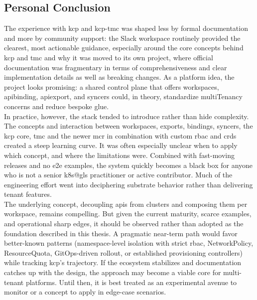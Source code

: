 \documentclass[11pt, a4paper, oneside, listof=totoc]{scrartcl}
\begin{document}
        \subsection{Personal Conclusion}\label{subsec:personalConclusion}
            The experience with \gls{kcp} and \gls{kcp}-\gls{tmc} was shaped less by formal
            documentation and more by community support: the Slack workspace routinely provided the
            clearest, most actionable guidance, especially around the core concepts behind \gls{kcp}
            and \gls{tmc} and why it was moved to its own project, where official documentation
            was fragmentary in terms of comprehensiveness and clear implementation details as well
            as breaking changes.
            As a platform idea, the project looks promising: a shared control plane that offers
            workspaces, \gls{apibinding}, \gls{apiexport}, and syncers could, in theory, standardize
            \gls{multiTenancy} concerns and reduce bespoke glue.\\
            In practice, however, the stack tended to introduce rather than hide complexity.
            The concepts and interaction between workspaces, exports, bindings, syncers, the
            \gls{kcp} core, \gls{tmc} and the newer \gls{mcr} in combination with custom \gls{rbac}
            and \glspl{crd} created a steep learning curve.
            It was often especially unclear when to apply which concept, and where the limitations
            were.
            Combined with fast-moving releases and no \gls{e2e} examples, the system quickly
            becomes a black box for anyone who is not a senior \gls{k8s@gls} practitioner or active
            contributor.
            Much of the engineering effort went into deciphering substrate behavior rather than
            delivering tenant features.\\
            The underlying concept, decoupling \glspl{api} from clusters and composing them per
            workspace, remains compelling.
            But given the current maturity, scarce examples, and operational sharp edges, it should
            be observed rather than adopted as the foundation described in this thesis.
            A pragmatic near-term path would favor better-known patterns (namespace-level isolation
            with strict \gls{rbac}, NetworkPolicy, ResourceQuota, GitOps-driven rollout, or
            established provisioning controllers) while tracking \gls{kcp}'s trajectory.
            If the ecosystem stabilizes and documentation catches up with the design, the approach
            may become a viable core for multi-tenant platforms.
            Until then, it is best treated as an experimental avenue to monitor or a concept to
            apply in edge-case scenarios.
\end{document}
